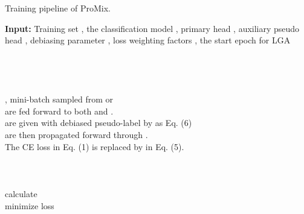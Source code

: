 \documentclass{article}
\begin{document}
\begin{algorithm}[h!]
\small
    \DontPrintSemicolon
    \SetNoFillComment
    \caption{Training pipeline of ProMix.}
    \label{alg:algorithm}
    \textbf{Input:} Training set , the classification model , primary head , auxiliary pseudo head , debiasing parameter , loss weighting factors  , the start epoch  for LGA \\
     \\
    \For {}
    {
         \\ 
         \\ 
          \\
        , mini-batch  sampled from  or  \\
         are fed forward to both  and . \\
         are given with debiased pseudo-label by  as Eq. (6) \\
         are then propagated forward through . \\
        The CE loss in Eq. (1) is replaced by  in Eq. (5). \\
          \\
          \\
          \\
        calculate  \\
        minimize loss  
    }
\end{algorithm}




\end{document}
